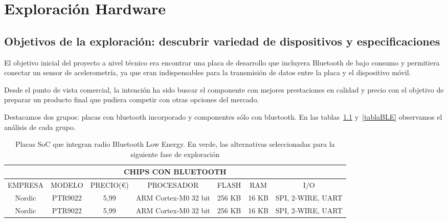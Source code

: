
\cleardoublepage


\chapter{Exploración Hardware}
\label{makereference3}

\section{Objetivos de la exploración: descubrir variedad de dispositivos y especificaciones}
\label{makereference3.1}

El objetivo inicial del proyecto a nivel técnico era encontrar una placa de desarrollo que incluyera Bluetooth de bajo consumo y permitiera conectar  un sensor de acelerometría, ya que eran indispensables para la transmisión de datos entre la placa y el dispositivo móvil. 

Desde el punto de vista comercial, la intención ha sido buscar el componente con mejores prestaciones en calidad y precio con el objetivo de preparar un producto final que pudiera competir con otras opciones del mercado.

Destacamos dos grupos: placas con bluetooth incorporado y componentes sólo con  bluetooth. En las tablas~\ref{tablaSoCBLE} y~\ref{tablaBLE} observamos el análisis de cada grupo.

\begin{table}
	\begin{center}
	\begin{small}
	\begin{tabular}[c]{|c|c|c|c|c|c|c|}
        \hline
        \multicolumn{7}{|c|}{CHIPS CON BLUETOOTH} \\
        \hline
        EMPRESA & MODELO & PRECIO(\euro{}) & PROCESADOR &  FLASH &  RAM & I/O \\
        \hline
        Nordic & PTR9022 & 5,99 & ARM Cortex-M0 32 bit & 256 KB & 16 KB & SPI, 2-WIRE, UART \\
        Nordic & PTR9022 & 5,99 & ARM Cortex-M0 32 bit & 256 KB & 16 KB & SPI, 2-WIRE, UART \\
    	\hline
	\end{tabular}
	\end{small}
    \caption{Placas SoC que integran radio Bluetooth Low Energy. En verde, las alternativas seleccionadas para la siguiente fase de exploración}
    \label{tablaSoCBLE}
   \end{center}
\end{table}

